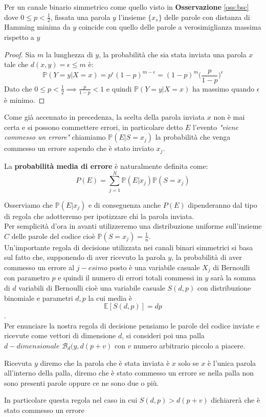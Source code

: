 \begin{teo}
Per un canale binario simmetrico come quello visto in \textbf{Osservazione} \ref{oss:bsc} dove $0 \leq p < \frac{1}{2}$, fissata una parola $y$ l'insieme $\{ x_s \}$ delle parole con distanza di Hamming minima da $y$ coincide con quello delle parole a verosimiglianza massima rispetto a $y$
\end{teo}
\begin{proof}
Sia $m$ la lunghezza di $y$, la probabilità che sia stata inviata una parola $x$ tale che $d(x,y)=\epsilon \leq m$ è:
$$\mathbb{P}(Y=y|X=x)= p^{\epsilon}(1-p)^{m-\epsilon}=(1-p)^m \bigg( \frac{p}{1-p} \bigg)^{\epsilon}$$
Dato che $0 \leq p < \frac{1}{2} \implies \frac{p}{1-p}<1 $ e quindi $\mathbb{P}(Y=y|X=x)$ ha massimo quando $\epsilon$ è minimo.
\end{proof}
Come già accennato in precedenza, la scelta della parola inviata $x$ non è mai certa e si possono commettere errori, in particolare detto $E$ l'evento \textit{"viene commesso un errore"} chiamiamo $\mathbb{P}(E|S=x_j)$ la probabilità che venga commesso un errore sapendo che è stato inviato $x_j$.
\begin{defi}
La \textbf{probabilità media di errore} è naturalmente definita come:
$$P(E)=\sum_{j=1}^{N}\mathbb{P}(E|x_j)\mathbb{P}(S=x_j)$$
\end{defi}
Osserviamo che $\mathbb{P}(E|x_j)$ e di conseguenza anche $P(E)$ dipenderanno dal tipo di regola che adotteremo per ipotizzare chi la parola inviata.\\
Per semplicità d'ora in avanti utilizzeremo una distribuzione uniforme sull'insieme $C$ delle parole del codice cioè $\mathbb{P}(S=x_j)=\frac{1}{n}$.\\
Un'importante regola di decisione utilizzata nei canali binari simmetrici si basa sul fatto che, supponendo di aver ricevuto la parola $y$, la probabilità di aver commesso un errore al $j-esimo$ posto è una variabile casuale $X_j$ di Bernoulli con parametro $p$ e quindi il numero di errori totali commessi in $y$ sarà la somma di $d$ variabili di Bernoulli cioè una variabile casuale $S(d,p)$ con distribuzione binomiale e parametri $d,p$ la cui media è
$$\mathbb{E}[S(d,p)]=dp$$.\\
Per enunciare la nostra regola di decisione pensiamo le parole del codice inviate e ricevute come vettori di dimensione $d$, si consideri poi una palla $d-dimensionale$ $\mathcal{B}_d(y,d(p+v)$ con $v$ numero arbitrario piccolo a piacere. 
\begin{defi} \label{defi:decisione}
Ricevuta $y$ diremo che la parola che è stata inviata è $x$ solo se $x$ è l'unica parola all'interno della palla, diremo che è stato commesso un errore se nella palla non sono presenti parole oppure ce ne sono due o più.
\end{defi}
In particolare questa regola nel caso in cui $S(d,p)>d(p+v)$ dichiarerà che è stato commesso un errore

